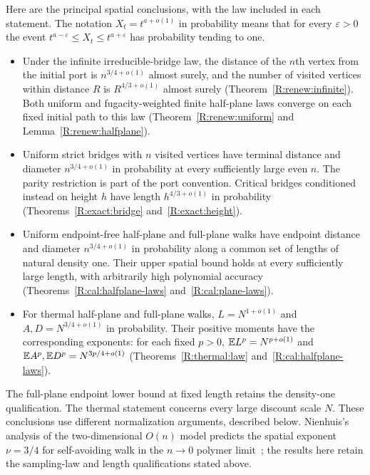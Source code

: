 Here are the principal spatial conclusions, with the law included in each statement. The notation $X_t=t^{a+o(1)}$ in probability means that for every $\varepsilon>0$ the event $t^{a-\varepsilon}\le X_t\le t^{a+\varepsilon}$ has probability tending to one.
\begin{itemize}
\item Under the infinite irreducible-bridge law, the distance of the $n$th vertex from the initial port is $n^{3/4+o(1)}$ almost surely, and the number of visited vertices within distance $R$ is $R^{4/3+o(1)}$ almost surely (Theorem~\ref{R:renew:infinite}). Both uniform and fugacity-weighted finite half-plane laws converge on each fixed initial path to this law (Theorem~\ref{R:renew:uniform} and Lemma~\ref{R:renew:halfplane}).
\item Uniform strict bridges with $n$ visited vertices have terminal distance and diameter $n^{3/4+o(1)}$ in probability at every sufficiently large even $n$. The parity restriction is part of the port convention. Critical bridges conditioned instead on height $h$ have length $h^{4/3+o(1)}$ in probability (Theorems~\ref{R:exact:bridge} and~\ref{R:exact:height}).
\item Uniform endpoint-free half-plane and full-plane walks have endpoint distance and diameter $n^{3/4+o(1)}$ in probability along a common set of lengths of natural density one. Their upper spatial bound holds at every sufficiently large length, with arbitrarily high polynomial accuracy (Theorems~\ref{R:cal:halfplane-laws} and~\ref{R:cal:plane-laws}).
\item For thermal half-plane and full-plane walks, $L=N^{1+o(1)}$ and $A,D=N^{3/4+o(1)}$ in probability. Their positive moments have the corresponding exponents: for each fixed $p>0$, $\mathbb E L^p=N^{p+o(1)}$ and $\mathbb E A^p,\mathbb E D^p=N^{3p/4+o(1)}$ (Theorems~\ref{R:thermal:law} and~\ref{R:cal:halfplane-laws}).
\end{itemize}
The full-plane endpoint lower bound at fixed length retains the density-one qualification. The thermal statement concerns every large discount scale $N$. These conclusions use different normalization arguments, described below. Nienhuis's analysis of the two-dimensional $O(n)$ model predicts the spatial exponent $\nu=3/4$ for self-avoiding walk in the $n\to0$ polymer limit~\cite[Eqs.~(1)--(2)]{Nienhuis1982}; the results here retain the sampling-law and length qualifications stated above.

